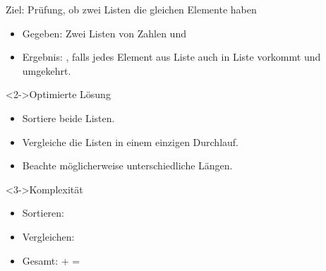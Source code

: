\begin{frame}
    \begin{block}{Ziel: Prüfung, ob zwei Listen die gleichen Elemente haben}
        \begin{itemize}
            \item Gegeben: Zwei Listen von Zahlen  und 
            \item Ergebnis: , falls jedes Element aus Liste  auch in Liste  vorkommt und umgekehrt.
        \end{itemize}
    \end{block}
    \begin{block}<2->{Optimierte Lösung}
        \begin{itemize}
            \item Sortiere beide Listen.
            \item Vergleiche die Listen in einem einzigen Durchlauf.
            \item Beachte möglicherweise unterschiedliche Längen.
        \end{itemize}
    \end{block}
    \begin{block}<3->{Komplexität}
        \begin{itemize}
            \item Sortieren: \onlog
            \item Vergleichen: \olin
            \item \alert{Gesamt}: \onlog + \olin = \alert{\onlog}
        \end{itemize}
    \end{block}
\end{frame}
